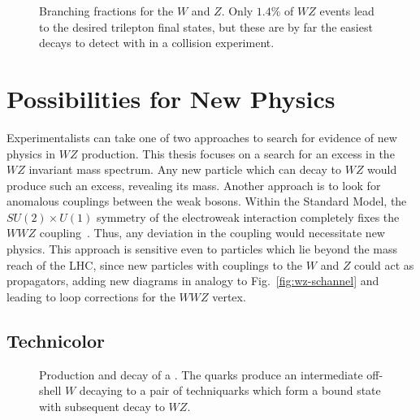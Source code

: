 \begin{figure*}[!htbp]
\centering
{}
\hspace{0.5in}
\caption[Branching fractions for the $W$ and $Z$ bosons]{Branching fractions for the $W$ and $Z$.  Only $1.4\%$ of $WZ$ events lead to the desired trilepton final states, but these are by far the easiest decays to detect with in a collision experiment.}
\label{pie-decays}
\end{figure*}

\section{Possibilities for New Physics}
\label{sec:newphysics}

Experimentalists can take one of two approaches to search for evidence of new physics in $WZ$ production.  This thesis focuses on a search for an excess in the $WZ$ invariant mass spectrum.  Any new particle which can decay to $WZ$ would produce such an excess, revealing its mass.  Another approach is to look for anomalous couplings between the weak bosons.  Within the Standard Model, the $SU(2) \times U(1)$ symmetry of the electroweak interaction completely fixes the $WWZ$ coupling~\cite{Baur:1994aj}.  Thus, any deviation in the coupling would necessitate new physics.  This approach is sensitive even to particles which lie beyond the mass reach of the LHC, since new particles with couplings to the $W$ and $Z$ could act as propagators, adding new diagrams in analogy to Fig.~\ref{fig:wz-schannel} and leading to loop corrections for the $WWZ$ vertex.

\subsection{Technicolor}
\label{sec:technicolor}

\begin{figure*}
\centering

\caption[Primary diagram for \technirho production]{Production and decay of a \technirho.  The quarks produce an intermediate off-shell $W$ decaying to a pair of techniquarks which form a \technirho bound state with subsequent decay to $WZ$.}
\label{fig:feynman-technirho}
\end{figure*}

